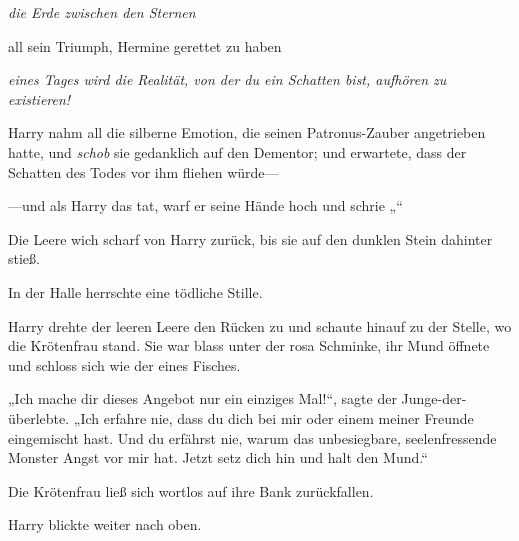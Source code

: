 \emph{die Erde zwischen den Sternen}

all sein Triumph, Hermine gerettet zu haben

\emph{eines Tages wird die Realität, von der du ein Schatten bist, aufhören zu existieren!}

Harry nahm all die silberne Emotion, die seinen Patronus-Zauber angetrieben hatte, und \emph{schob} sie gedanklich auf den Dementor; und erwartete, dass der Schatten des Todes vor ihm fliehen würde—

—und als Harry das tat, warf er seine Hände hoch und schrie „“

Die Leere wich scharf von Harry zurück, bis sie auf den dunklen Stein dahinter stieß.

In der Halle herrschte eine tödliche Stille.

Harry drehte der leeren Leere den Rücken zu und schaute hinauf zu der Stelle, wo die Krötenfrau stand. Sie war blass unter der rosa Schminke, ihr Mund öffnete und schloss sich wie der eines Fisches.

„Ich mache dir dieses Angebot nur ein einziges Mal!“, sagte der Junge-der-überlebte.
„Ich erfahre nie, dass du dich bei mir oder einem meiner Freunde eingemischt hast. Und du erfährst nie, warum das unbesiegbare, seelenfressende Monster Angst vor mir hat. Jetzt setz dich hin und halt den Mund.“

Die Krötenfrau ließ sich wortlos auf ihre Bank zurückfallen.

Harry blickte weiter nach oben.

